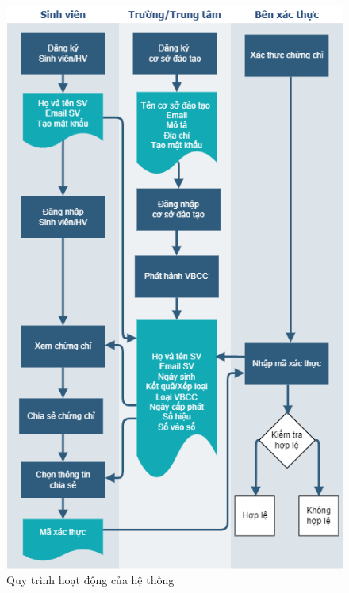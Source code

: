 \begin{figure}[htbp]
\centering
\includegraphics[width=.9\linewidth]{img/vbcc_diagram2.png}
\caption{Quy trình hoạt động của hệ thống}
\label{fig:vbcc_diagram}
\end{figure}
